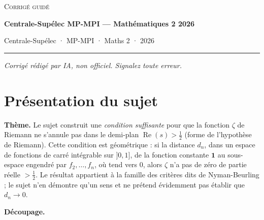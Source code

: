 \documentclass[11pt,a4paper]{article}
\newcommand{\equationajustee}[1]{%
  \sbox{\boiteequation}{$\displaystyle #1$}%
  \ifdim\wd\boiteequation>\linewidth
    \[\resizebox{\linewidth}{!}{\usebox{\boiteequation}}\]%
  \else
    \[#1\]%
  \fi}
\begin{document}
\thispagestyle{plain}
\begin{center}
  {\small\scshape Corrigé guidé}\par\smallskip
  {\LARGE\bfseries Centrale-Supélec MP-MPI — Mathématiques 2 2026\par}\medskip
  {\large Centrale-Supélec · MP-MPI · Maths 2 · 2026\par}
\end{center}
\vspace{2pt}\hrule\vspace{8pt}

\emph{Corrigé rédigé par IA, non officiel. Signalez toute erreur.}

\hypertarget{pruxe9sentation-du-sujet}{%
\section{Présentation du sujet}\label{pruxe9sentation-du-sujet}}

\textbf{Thème.} Le sujet construit une \emph{condition suffisante} pour que la fonction \(\zeta\) de Riemann ne s'annule pas dans le demi-plan \(\operatorname{Re}(s)>\frac12\) (forme de l'hypothèse de Riemann). Cette condition est géométrique : si la distance \(d_n\), dans un espace de fonctions de carré intégrable sur \(]0,1]\), de la fonction constante \(\mathbf 1\) au sous-espace engendré par \(f_2,\dots,f_n\), où
\equationajustee{f_k(t)=\frac1k\Bigl\lfloor\frac1t\Bigr\rfloor-\Bigl\lfloor\frac1{kt}\Bigr\rfloor,}
tend vers \(0\), alors \(\zeta\) n'a pas de zéro de partie réelle \(>\frac12\). Le résultat appartient à la famille des critères dits de Nyman-Beurling ; le sujet n'en démontre qu'un sens et ne prétend évidemment pas établir que \(d_n\to0\).

\textbf{Découpage.}
\end{document}

